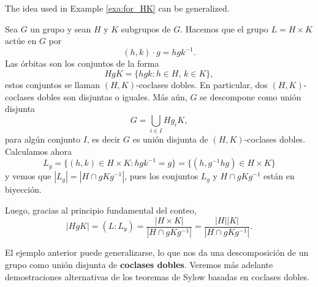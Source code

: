 \chapter{}


The idea used in Example \ref{exa:for_HK} can be generalized. 

\begin{example}
Sea $G$ un grupo y sean $H$ y $K$ subgrupos de $G$. Hacemos
que el grupo $L=H\times K$ actúe en $G$ por
\[
(h,k)\cdot g=hgk^{-1}.
\]
Las órbitas son los conjuntos de la forma
\[
HgK=\{hgk:h\in H,\,k\in K\},
\]
estos conjuntos se llaman $(H,K)$-coclases dobles.
En particular, dos $(H,K)$-coclases dobles son disjuntas o iguales. Más aún,
$G$ se descompone como unión disjunta
\[
G=\bigcup_{i\in I}Hg_iK,
\]
para algún conjunto $I$, es decir $G$
es unión disjunta de $(H,K)$-coclases dobles.
Calculamos ahora
\[
L_g=\{(h,k)\in H\times K:hgk^{-1}=g\}=\{(h,g^{-1}hg)\in H\times K\}
\]
y vemos que $|L_g|=|H\cap gKg^{-1}|$, pues los conjuntos $L_g$ y $H\cap gKg^{-1}$ están en biyección.

Luego,
gracias al principio fundamental del conteo,
\[
|HgK|=(L:L_g)=\frac{|H\times K|}{|H\cap gKg^{-1}|}=\frac{|H||K|}{|H\cap gKg^{-1}|}.
\]
\end{example}

El ejemplo anterior puede generalizarse, lo que nos da una descomposición
de un grupo como unión disjunta de \textbf{coclases dobles}. Veremos más adelante
demostraciones alternativas de los teoremas de Sylow basadas en
coclases dobles.